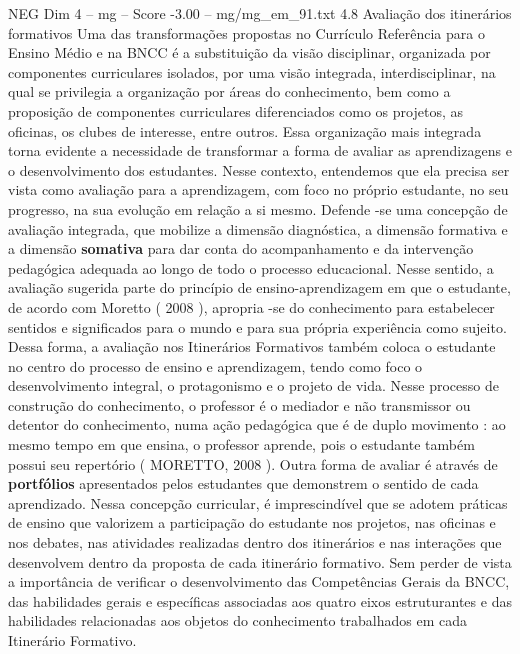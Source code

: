 \begin{textsample}{NEG Dim 4 – mg – Score -3.00 – mg/mg\_em\_91.txt}  \label{ex:f4_neg_094}
4.8 Avaliação dos itinerários formativos Uma das transformações propostas no Currículo Referência para o Ensino Médio e na BNCC é a substituição da visão disciplinar, organizada por componentes curriculares isolados, por uma visão integrada, interdisciplinar, na qual se privilegia a organização por áreas do conhecimento, bem como a proposição de componentes curriculares diferenciados como os projetos, as oficinas, os clubes de interesse, entre outros.
Essa organização mais integrada torna evidente a necessidade de transformar a forma de avaliar as aprendizagens e o desenvolvimento dos estudantes.
Nesse contexto, entendemos que ela precisa ser vista como avaliação para a aprendizagem, com foco no próprio estudante, no seu progresso, na sua evolução em relação a si mesmo.
Defende -se uma concepção de avaliação integrada, que mobilize a dimensão diagnóstica, a dimensão formativa e a dimensão \textbf{somativa} para dar conta do acompanhamento e da intervenção pedagógica adequada ao longo de todo o processo educacional.
Nesse sentido, a avaliação sugerida parte do princípio de ensino-aprendizagem em que o estudante, de acordo com Moretto ( 2008 ), apropria -se do conhecimento para estabelecer sentidos e significados para o mundo e para sua própria experiência como sujeito.
Dessa forma, a avaliação nos Itinerários Formativos também coloca o estudante no centro do processo de ensino e aprendizagem, tendo como foco o desenvolvimento integral, o protagonismo e o projeto de vida.
Nesse processo de construção do conhecimento, o professor é o mediador e não transmissor ou detentor do conhecimento, numa ação pedagógica que é de duplo movimento : ao mesmo tempo em que ensina, o professor aprende, pois o estudante também possui seu repertório ( MORETTO, 2008 ).
Outra forma de avaliar é através de \textbf{portfólios} apresentados pelos estudantes que demonstrem o sentido de cada aprendizado.
Nessa concepção curricular, é imprescindível que se adotem práticas de ensino que valorizem a participação do estudante nos projetos, nas oficinas e nos debates, nas atividades realizadas dentro dos itinerários e nas interações que desenvolvem dentro da proposta de cada itinerário formativo.
Sem perder de vista a importância de verificar o desenvolvimento das Competências Gerais da BNCC, das habilidades gerais e específicas associadas aos quatro eixos estruturantes e das habilidades relacionadas aos objetos do conhecimento trabalhados em cada Itinerário Formativo.

\end{textsample}

